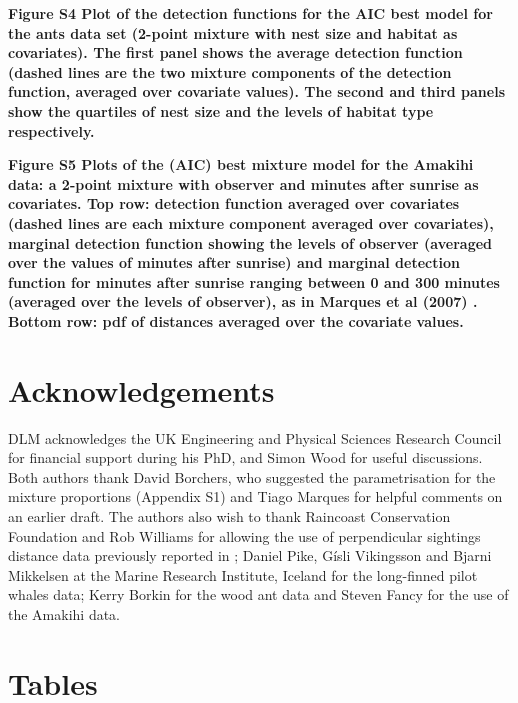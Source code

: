 \documentclass[10pt]{article}
\begin{document}
\textbf{Figure S4 Plot of the detection functions for the AIC best model for the ants data set (2-point mixture with nest size and habitat as covariates). The first panel shows the average detection function (dashed lines are the two mixture components of the detection function, averaged over covariate values). The second and third panels show the quartiles of nest size and the levels of habitat type respectively.}

\textbf{Figure S5 Plots of the (AIC) best mixture model for the Amakihi data: a 2-point mixture with observer and minutes after sunrise as covariates. Top row: detection function averaged over covariates (dashed lines are each mixture component averaged over covariates), marginal detection function showing the levels of observer (averaged over the values of minutes after sunrise) and marginal detection function for minutes after sunrise ranging between 0 and 300 minutes (averaged over the levels of observer), as in Marques et al (2007) \cite{Marques:2007vm}. Bottom row: pdf of distances averaged over the covariate values.}


\section*{Acknowledgements}

DLM acknowledges the UK Engineering and Physical Sciences Research Council for financial support during his PhD, and Simon Wood for useful discussions.  Both authors thank David Borchers, who suggested the parametrisation for the mixture proportions (Appendix S1) and Tiago Marques for helpful comments on an earlier draft. The authors also wish to thank Raincoast Conservation Foundation and Rob Williams for allowing the use of perpendicular sightings distance data previously reported in \cite{Williams:2007tc}; Daniel Pike, G\'{i}sli Vikingsson and Bjarni Mikkelsen at the Marine Research Institute, Iceland for the long-finned pilot whales data; Kerry Borkin for the wood ant data and Steven Fancy for the use of the Amakihi data.



\section*{Tables}
\end{document}
